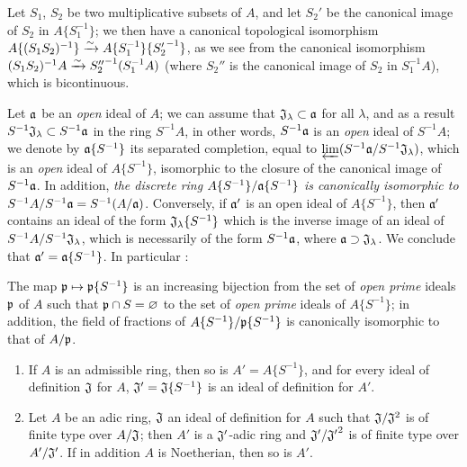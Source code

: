 \begin{env}[7.6.8]
\label{0.7.6.8}
Let $S_1$, $S_2$ be two multiplicative subsets of $A$, and let $S_2'$ be the canonical image of
$S_2$ in $A\{S_1^{-1}\}$; we then have a canonical topological isomorphism
$A\{(S_1 S_2)^{-1}\}\xrightarrow{\sim} A\{S_1^{-1}\}\{{S_2'}^{-1}\}$, as we see from the canonical isomorphism
$(S_1 S_2)^{-1}A\xrightarrow{\sim}{S_2''}^{-1}(S_1^{-1}A)$ (where $S_2''$ is the canonical image of $S_2$ in
$S_1^{-1}A$), which is bicontinuous.
\end{env}

\begin{env}[7.6.9]
\label{0.7.6.9}
Let $\mathfrak{a}$ be an \emph{open} ideal of $A$; we can assume that
$\mathfrak{J}_\lambda\subset\mathfrak{a}$ for all $\lambda$, and as a result
$S^{-1}\mathfrak{J}_\lambda\subset S^{-1}\mathfrak{a}$ in the ring $S^{-1}A$, in other words,
$S^{-1}\mathfrak{a}$ is an \emph{open} ideal of $S^{-1}A$; we denote by $\mathfrak{a}\{S^{-1}\}$ its
separated completion, equal to $\varprojlim(S^{-1}\mathfrak{a}/S^{-1}\mathfrak{J}_\lambda)$, which is
an \emph{open} ideal of $A\{S^{-1}\}$, isomorphic to the closure of the canonical image of
$S^{-1}\mathfrak{a}$. In addition, \emph{the discrete ring $A\{S^{-1}\}/\mathfrak{a}\{S^{-1}\}$ is
canonically isomorphic to $S^{-1}A/S^{-1}\mathfrak{a}=S^{-1}(A/\mathfrak{a})$}. Conversely, if
$\mathfrak{a}'$ is an open ideal of $A\{S^{-1}\}$, then $\mathfrak{a}'$ contains an ideal of the
form $\mathfrak{J}_\lambda\{S^{-1}\}$ which is the inverse image of an ideal of
$S^{-1}A/S^{-1}\mathfrak{J}_\lambda$, which is necessarily  of the
form $S^{-1}\mathfrak{a}$, where $\mathfrak{a}\supset\mathfrak{J}_\lambda$. We conclude that
$\mathfrak{a}'=\mathfrak{a}\{S^{-1}\}$. In particular :
\end{env}

\begin{prop}[7.6.10]
\label{0.7.6.10}
The map $\fk{p}\mapsto\fk{p}\{S^{-1}\}$ is an increasing bijection from the set of
\emph{open prime} ideals $\mathfrak{p}$ of $A$ such that $\mathfrak{p}\cap S=\varnothing$ to the set
of \emph{open prime} ideals
of $A\{S^{-1}\}$; in addition, the field of fractions of $A\{S^{-1}\}/\mathfrak{p}\{S^{-1}\}$ is
canonically isomorphic to that of $A/\mathfrak{p}$.
\end{prop}

\begin{prop}[7.6.11]
\label{0.7.6.11}
\medskip\noindent
\begin{enumerate}[label=\emph{(\roman*)}]
  \item If $A$ is an admissible ring, then so is $A'=A\{S^{-1}\}$, and for every ideal
    of definition $\mathfrak{J}$ for $A$, $\mathfrak{J}'=\mathfrak{J}\{S^{-1}\}$ is an ideal of
    definition for $A'$.
  \item Let $A$ be an adic ring, $\mathfrak{J}$ an ideal of definition for $A$ such that
    $\mathfrak{J}/\mathfrak{J}^2$ is of finite type over $A/\mathfrak{J}$; then $A'$ is a
    $\mathfrak{J}'$-adic ring and $\mathfrak{J}'/{\mathfrak{J}'}^2$ is of finite type over
    $A'/\mathfrak{J}'$. If in addition $A$ is Noetherian, then so is $A'$.
\end{enumerate}
\end{prop}

